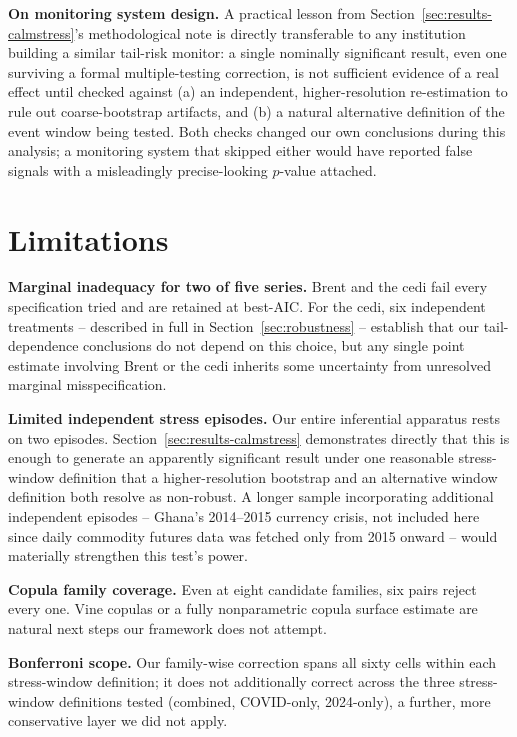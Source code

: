\documentclass[final,3p,times,authoryear]{elsarticle}
\begin{document}
\textbf{On monitoring system design.} A practical lesson from
Section~\ref{sec:results-calmstress}'s methodological note is directly
transferable to any institution building a similar tail-risk monitor:
a single nominally significant result, even one surviving a
formal multiple-testing correction, is not sufficient evidence of a real
effect until checked against (a) an independent, higher-resolution
re-estimation to rule out coarse-bootstrap artifacts, and (b) a natural
alternative definition of the event window being tested. Both checks
changed our own conclusions during this analysis; a monitoring system
that skipped either would have reported false signals with a
misleadingly precise-looking $p$-value attached.

\section{Limitations}
\label{sec:limitations}

\textbf{Marginal inadequacy for two of five series.} Brent and the cedi
fail every specification tried and are retained at best-AIC. For the
cedi, six independent treatments -- described in full in
Section~\ref{sec:robustness} -- establish that our tail-dependence
conclusions do not depend on this choice, but any single point estimate
involving Brent or the cedi inherits some uncertainty from unresolved
marginal misspecification.

\textbf{Limited independent stress episodes.} Our entire inferential
apparatus rests on two episodes. Section~\ref{sec:results-calmstress}
demonstrates directly that this is enough to generate an apparently
significant result under one reasonable stress-window definition that a
higher-resolution bootstrap and an alternative window definition both
resolve as non-robust. A longer sample incorporating additional
independent episodes -- Ghana's 2014--2015 currency crisis, not included
here since daily commodity futures data was fetched only from 2015
onward -- would materially strengthen this test's power.

\textbf{Copula family coverage.} Even at eight candidate families, six
pairs reject every one. Vine copulas or a fully nonparametric copula
surface estimate are natural next steps our framework does not attempt.

\textbf{Bonferroni scope.} Our family-wise correction spans all sixty
cells within each stress-window definition; it does not additionally
correct across the three stress-window definitions tested (combined,
COVID-only, 2024-only), a further, more conservative layer we did not
apply.
\end{document}
